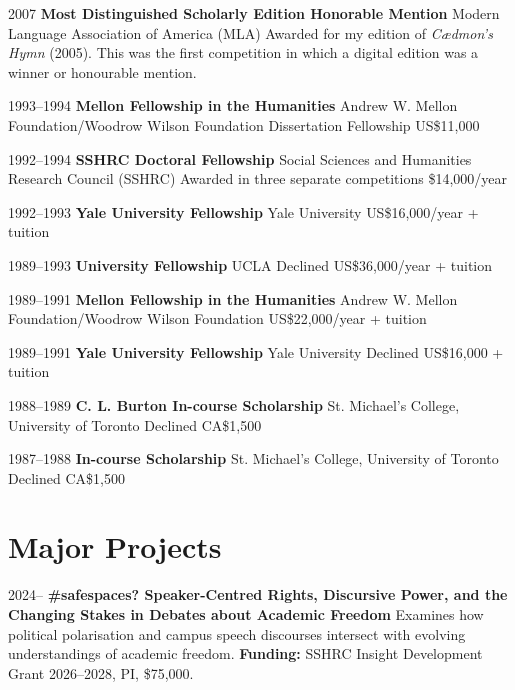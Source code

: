 \documentclass[11pt,letterpaper,sans]{moderncv}
\begin{document}
{\cventry
  {2007}
  {\textbf{Most Distinguished Scholarly Edition Honorable Mention}}
  {Modern Language Association of America (MLA)}
  {}
  {}
  {Awarded for my edition of \emph{Cædmon’s Hymn} (2005). This was the first competition in which a digital edition was a winner or honourable mention.}

\cventry
  {1993--1994}
  {\textbf{Mellon Fellowship in the Humanities}}
  {Andrew W. Mellon Foundation/Woodrow Wilson Foundation}
  {Dissertation Fellowship}
  {US\$11{,}000}
  {}

\cventry
  {1992--1994}
  {\textbf{SSHRC Doctoral Fellowship}}
  {Social Sciences and Humanities Research Council (SSHRC)}
  {Awarded in three separate competitions}
  {\$14{,}000/year}
  {}

\cventry
  {1992--1993}
  {\textbf{Yale University Fellowship}}
  {Yale University}
  {}
  {US\$16{,}000/year + tuition}
  {}

\cventry
  {1989--1993}
  {\textbf{University Fellowship}}
  {UCLA}
  {Declined}
  {US\$36{,}000/year + tuition}
  {}

\cventry
  {1989--1991}
  {\textbf{Mellon Fellowship in the Humanities}}
  {Andrew W. Mellon Foundation/Woodrow Wilson Foundation}
  {}
  {US\$22{,}000/year + tuition}
  {}

\cventry
  {1989--1991}
  {\textbf{Yale University Fellowship}}
  {Yale University}
  {Declined}
  {US\$16{,}000 + tuition}
  {}

\cventry
  {1988--1989}
  {\textbf{C. L. Burton In-course Scholarship}}
  {St. Michael’s College, University of Toronto}
  {Declined}
  {CA\$1{,}500}
  {}

\cventry
  {1987--1988}
  {\textbf{In-course Scholarship}}
  {St. Michael’s College, University of Toronto}
  {Declined}
  {CA\$1{,}500}
  {}

\section{\textbf{Major Projects}}


\cventry
  {2024--}
  {\textbf{\#safespaces? Speaker-Centred Rights, Discursive Power, and the Changing Stakes in Debates about Academic Freedom}}
  {}
  {}
  {Examines how political polarisation and campus speech discourses intersect with evolving understandings of academic freedom.}
  {\textbf{Funding:} SSHRC Insight Development Grant 2026--2028, PI, \$75,000.}

}
\end{document}
